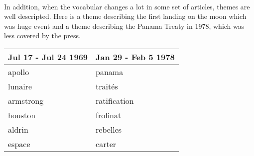 \paragraph{}
In addition, when the vocabular changes a lot in some set of articles, themes are well descripted. Here is a theme describing the first landing on the moon which was huge event and a theme describing the Panama Treaty in 1978, which was less covered by the press.


\begin{center}
\begin{tabular}{|l|l|}
  \hline
  Jul 17 - Jul 24 1969 & Jan 29 - Feb 5 1978 \\
  \hline
  apollo & panama \\
  lunaire & traités \\
  armstrong & ratification \\
  houston & frolinat \\
  aldrin & rebelles \\
  espace & carter \\
  \hline
\end{tabular}
\end{center}


